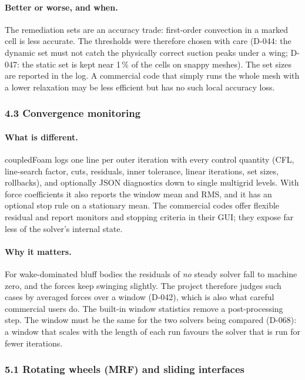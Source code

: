 \paragraph{Better or worse, and when.} The remediation sets are an
accuracy trade: first-order convection in a marked cell is less accurate.
The thresholds were therefore chosen with care (D-044: the dynamic set must
not catch the physically correct suction peaks under a wing; D-047: the
static set is kept near 1\,\% of the cells on snappy meshes). The set
sizes are reported in the log. A commercial code that simply runs the whole mesh with a
lower relaxation may be less efficient but has no such local accuracy loss.

\subsubsection*{4.3 Convergence monitoring}

\paragraph{What is different.} coupledFoam logs one line per outer
iteration with every control quantity (CFL, line-search factor, cuts,
residuals, inner tolerance, linear iterations, set sizes, rollbacks), and
optionally JSON diagnostics down to single multigrid levels. With force
coefficients it also reports the window mean and RMS, and it has an
optional stop rule on a stationary mean. The commercial codes offer
flexible residual and report monitors and stopping criteria in their GUI;
they expose far less of the solver's internal state.

\paragraph{Why it matters.} For wake-dominated bluff bodies the residuals of
\emph{no} steady solver fall to machine zero, and the forces keep swinging
slightly. The project therefore judges such cases by averaged forces over a
window (D-042), which is also what careful commercial users do. The
built-in window statistics remove a post-processing step. The window must
be the same for the two solvers being compared (D-068): a window that
scales with the length of each run favours the solver that is run for
fewer iterations.

\subsubsection*{5.1 Rotating wheels (MRF) and sliding interfaces}


